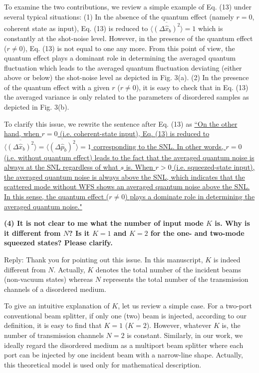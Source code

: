 \documentclass[10pt]{article}
\begin{document}
To examine the two contributions, we review a simple example of Eq. (13) under several typical situations: (1) In the absence of the quantum effect (namely $r=0$, coherent state as input), Eq. (13) is reduced to $\overline{ \langle (\Delta \hat{x}_b )^2 \rangle } = 1$ which is constantly at the shot-noise level. However, in the presence of the quantum effect ($r \ne 0$), Eq. (13) is not equal to one any more. From this point of view, the quantum effect plays a dominant role in determining the averaged quantum fluctuation which leads to the averaged quantum fluctuation deviating (either above or below) the shot-noise level as depicted in Fig. 3(a). (2) In the presence of the quantum effect with a given $r$ ($r \ne 0$), it is easy to check that in Eq. (13) the averaged variance is only related to the parameters of disordered samples as depicted in Fig. 3(b).

To clarify this issue, we rewrite the sentence after Eq. (13) as {\uline{``On the other hand, when $r=0$ (i.e. coherent-state input), Eq. (13) is reduced to $\overline{\langle (\Delta \hat{x}_{b})^2 \rangle} = \overline{\langle (\Delta \hat{p}_{b})^2 \rangle} = 1$ corresponding to the SNL. In other words, $r=0$ (i.e. without quantum effect) leads to the fact that the averaged quantum noise is always at the SNL regardless of what $s$ is. When $r>0$ (i.e. squeezed-state input), the averaged quantum noise is always above the SNL, which indicates that the scattered mode without WFS shows an averaged quantum noise above the SNL. In this sense, the quantum effect ($r\neq 0$) plays a dominate role in determining the averaged quantum noise."}}

{\bf{(4) It is not clear to me what the number of input mode $K$ is. Why is it different from $N$? Is it $K = 1$ and $K = 2$ for the one- and two-mode squeezed states? Please clarify.}}

Reply: Thank you for pointing out this issue. In this manuscript, $K$ is indeed different from $N$. Actually, $K$ denotes the total number of the incident beams (non-vacuum states) whereas $N$ represents the total number of the transmission channels of a disordered medium. 

To give an intuitive explanation of $K$, let us review a simple case. For a two-port conventional beam splitter, if only one (two) beam is injected, according to our definition, it is easy to find that $K=1$ ($K=2$). However, whatever $K$ is, the number of transmission channels $N=2$ is constant. Similarly, in our work, we ideally regard the disordered medium as a multiport beam splitter where each port can be injected by one incident beam with a narrow-line shape. Actually, this theoretical model is used only for mathematical description.
\end{document}
